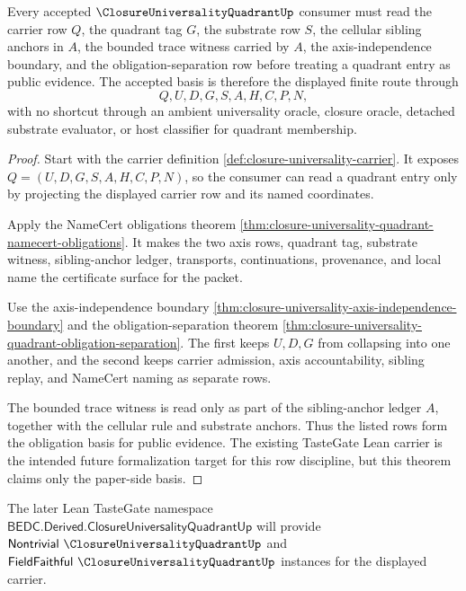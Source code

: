 \begin{theorem}
\label{thm:closure-universality-quadrant-obligation-basis}
Every accepted $\ClosureUniversalityQuadrantUp$ consumer must read the carrier row $Q$, the quadrant tag $G$, the substrate row $S$, the cellular sibling anchors in $A$, the bounded trace witness carried by $A$, the axis-independence boundary, and the obligation-separation row before treating a quadrant entry as public evidence. The accepted basis is therefore the displayed finite route through
$$
Q,U,D,G,S,A,H,C,P,N,
$$
with no shortcut through an ambient universality oracle, closure oracle, detached substrate evaluator, or host classifier for quadrant membership.
\end{theorem}
\begin{proof}
Start with the carrier definition \autoref{def:closure-universality-carrier}. It exposes $Q=(U,D,G,S,A,H,C,P,N)$, so the consumer can read a quadrant entry only by projecting the displayed carrier row and its named coordinates.

Apply the NameCert obligations theorem \autoref{thm:closure-universality-quadrant-namecert-obligations}. It makes the two axis rows, quadrant tag, substrate witness, sibling-anchor ledger, transports, continuations, provenance, and local name the certificate surface for the packet.

Use the axis-independence boundary \autoref{thm:closure-universality-axis-independence-boundary} and the obligation-separation theorem \autoref{thm:closure-universality-quadrant-obligation-separation}. The first keeps $U,D,G$ from collapsing into one another, and the second keeps carrier admission, axis accountability, sibling replay, and NameCert naming as separate rows.

The bounded trace witness is read only as part of the sibling-anchor ledger $A$, together with the cellular rule and substrate anchors. Thus the listed rows form the obligation basis for public evidence. The existing TasteGate Lean carrier is the intended future formalization target for this row discipline, but this theorem claims only the paper-side basis.
\end{proof}

The later Lean TasteGate namespace $\mathsf{BEDC.Derived.ClosureUniversalityQuadrantUp}$ will provide $\mathsf{Nontrivial}\ \ClosureUniversalityQuadrantUp$ and $\mathsf{FieldFaithful}\ \ClosureUniversalityQuadrantUp$ instances for the displayed carrier.

